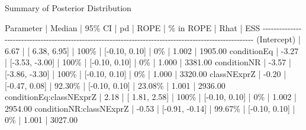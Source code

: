 \documentclass[
  ignorenonframetext,
]{beamer}
\newenvironment{Shaded}{\begin{snugshade}}{\end{snugshade}}
\newcommand{\ControlFlowTok}[1]{\textcolor[rgb]{0.00,0.23,0.31}{#1}}
\newcommand{\DecValTok}[1]{\textcolor[rgb]{0.68,0.00,0.00}{#1}}
\newcommand{\ErrorTok}[1]{\textcolor[rgb]{0.68,0.00,0.00}{#1}}
\newcommand{\FloatTok}[1]{\textcolor[rgb]{0.68,0.00,0.00}{#1}}
\newcommand{\NormalTok}[1]{\textcolor[rgb]{0.00,0.23,0.31}{#1}}
\newcommand{\SpecialCharTok}[1]{\textcolor[rgb]{0.37,0.37,0.37}{#1}}
\begin{document}
\begin{frame}[fragile]
\tiny

\begin{Shaded}
\begin{Highlighting}[]
\NormalTok{Summary of Posterior Distribution}

\NormalTok{Parameter               }\SpecialCharTok{|}\NormalTok{ Median }\SpecialCharTok{|}         \DecValTok{95}\SpecialCharTok{\% CI |     pd |          ROPE | \%} \ControlFlowTok{in}\NormalTok{ ROPE }\SpecialCharTok{|}\NormalTok{  Rhat }\SpecialCharTok{|}\NormalTok{     ESS}
\SpecialCharTok{{-}{-}{-}{-}{-}{-}{-}{-}{-}{-}{-}{-}{-}{-}{-}{-}{-}{-}{-}{-}{-}{-}{-}{-}{-}{-}{-}{-}{-}{-}{-}{-}{-}{-}{-}{-}{-}{-}{-}{-}{-}{-}{-}{-}{-}{-}{-}{-}{-}{-}{-}{-}{-}{-}{-}{-}{-}{-}{-}{-}{-}{-}{-}{-}{-}{-}{-}{-}{-}{-}{-}{-}{-}{-}{-}{-}{-}{-}{-}{-}{-}{-}{-}{-}{-}{-}{-}{-}{-}{-}{-}{-}{-}{-}{-}{-}{-}{-}{-}{-}{-}{-}{-}{-}}
\NormalTok{(Intercept)             }\SpecialCharTok{|}   \FloatTok{6.67} \SpecialCharTok{|}\NormalTok{ [ }\FloatTok{6.38}\NormalTok{,  }\FloatTok{6.95}\NormalTok{] }\SpecialCharTok{|}   \DecValTok{100}\SpecialCharTok{\% | [{-}0.10, 0.10] |        0\%} \ErrorTok{|} \FloatTok{1.002} \SpecialCharTok{|} \FloatTok{1905.00}
\NormalTok{conditionEq             }\SpecialCharTok{|}  \SpecialCharTok{{-}}\FloatTok{3.27} \SpecialCharTok{|}\NormalTok{ [}\SpecialCharTok{{-}}\FloatTok{3.53}\NormalTok{, }\SpecialCharTok{{-}}\FloatTok{3.00}\NormalTok{] }\SpecialCharTok{|}   \DecValTok{100}\SpecialCharTok{\% | [{-}0.10, 0.10] |        0\%} \ErrorTok{|} \FloatTok{1.000} \SpecialCharTok{|} \FloatTok{3381.00}
\NormalTok{conditionNR             }\SpecialCharTok{|}  \SpecialCharTok{{-}}\FloatTok{3.57} \SpecialCharTok{|}\NormalTok{ [}\SpecialCharTok{{-}}\FloatTok{3.86}\NormalTok{, }\SpecialCharTok{{-}}\FloatTok{3.30}\NormalTok{] }\SpecialCharTok{|}   \DecValTok{100}\SpecialCharTok{\% | [{-}0.10, 0.10] |        0\%} \ErrorTok{|} \FloatTok{1.000} \SpecialCharTok{|} \FloatTok{3320.00}
\NormalTok{classNExprZ             }\SpecialCharTok{|}  \SpecialCharTok{{-}}\FloatTok{0.20} \SpecialCharTok{|}\NormalTok{ [}\SpecialCharTok{{-}}\FloatTok{0.47}\NormalTok{,  }\FloatTok{0.08}\NormalTok{] }\SpecialCharTok{|} \FloatTok{92.30}\SpecialCharTok{\% | [{-}0.10, 0.10] |    23.08\%} \ErrorTok{|} \FloatTok{1.001} \SpecialCharTok{|} \FloatTok{2936.00}
\NormalTok{conditionEq}\SpecialCharTok{:}\NormalTok{classNExprZ }\SpecialCharTok{|}   \FloatTok{2.18} \SpecialCharTok{|}\NormalTok{ [ }\FloatTok{1.81}\NormalTok{,  }\FloatTok{2.58}\NormalTok{] }\SpecialCharTok{|}   \DecValTok{100}\SpecialCharTok{\% | [{-}0.10, 0.10] |        0\%} \ErrorTok{|} \FloatTok{1.002} \SpecialCharTok{|} \FloatTok{2954.00}
\NormalTok{conditionNR}\SpecialCharTok{:}\NormalTok{classNExprZ }\SpecialCharTok{|}  \SpecialCharTok{{-}}\FloatTok{0.53} \SpecialCharTok{|}\NormalTok{ [}\SpecialCharTok{{-}}\FloatTok{0.91}\NormalTok{, }\SpecialCharTok{{-}}\FloatTok{0.14}\NormalTok{] }\SpecialCharTok{|} \FloatTok{99.67}\SpecialCharTok{\% | [{-}0.10, 0.10] |        0\%} \ErrorTok{|} \FloatTok{1.001} \SpecialCharTok{|} \FloatTok{3027.00}
\end{Highlighting}
\end{Shaded}
\end{frame}
\end{document}
